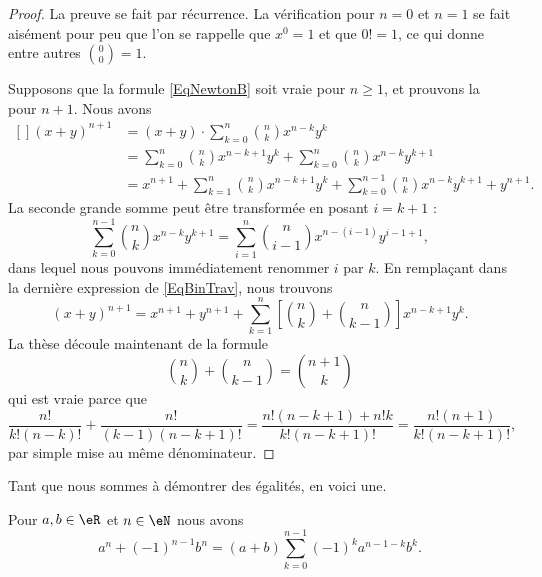 \begin{proof}
    La preuve se fait par récurrence. La vérification pour $n=0$ et $n=1$ se fait aisément pour peu que l'on se rappelle que \( x^0=1\) et que \( 0!=1\), ce qui donne entre autres \( {0\choose 0}=1\).

    Supposons que la formule \eqref{EqNewtonB} soit vraie pour $n\geq1$, et prouvons la pour $n+1$. Nous avons
\begin{equation}        \label{EqBinTrav}
    \begin{aligned}[]
        (x+y)^{n+1} &=(x+y)\cdot  \sum_{k=0}^n{n\choose k}x^{n-k}y^k\\
                &= \sum_{k=0}^n{n\choose k}x^{n-k+1}y^k+\sum_{k=0}^n{n\choose k}x^{n-k}y^{k+1}\\
                &=x^{n+1}+ \sum_{k=1}^n{n\choose k}x^{n-k+1}y^k+\sum_{k=0}^{n-1}{n\choose k}x^{n-k}y^{k+1}+y^{n+1}.
    \end{aligned}
\end{equation}
La seconde grande somme peut être transformée en posant $i=k+1$ :
\begin{equation}
    \sum_{k=0}^{n-1}{n\choose k}x^{n-k}y^{k+1}  =\sum_{i=1}^n{n\choose i-1}x^{n-(i-1)}y^{i-1+1},
\end{equation}
dans lequel nous pouvons immédiatement renommer $i$ par $k$. En remplaçant dans la dernière expression de \eqref{EqBinTrav}, nous trouvons
\begin{equation}
    (x+y)^{n+1}=x^{n+1}+y^{n+1}+\sum_{k=1}^n\left[ {n\choose k}+{n\choose k-1} \right]x^{n-k+1}y^k.
\end{equation}
La thèse découle maintenant de la formule
\begin{equation}
    {n\choose k}+{n\choose k-1}={n+1\choose k}
\end{equation}
qui est vraie parce que
\begin{equation}
    \frac{ n! }{ k!(n-k)! }+\frac{ n! }{ (k-1)(n-k+1)! }=\frac{ n!(n-k+1)+n!k }{ k!(n-k+1)! }=\frac{ n!(n+1) }{  k!(n-k+1)!  },
\end{equation}
par simple mise au même dénominateur.
\end{proof}

Tant que nous sommes à démontrer des égalités, en voici une.

\begin{lemma}     \label{LEMooLPOQooICJYdV}
    Pour \( a,b\in \eR\) et \( n\in \eN\) nous avons
    \begin{equation}
        a^n+(-1)^{n-1}b^n=(a+b)\sum_{k=0}^{n-1}(-1)^ka^{n-1-k}b^k.
    \end{equation}
\end{lemma}

